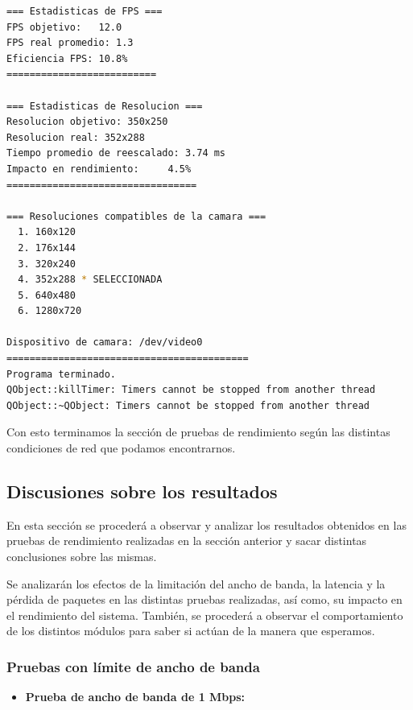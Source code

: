 \begin{adjustbox}{max width=\textwidth}
\begin{lstlisting}[language=bash,basicstyle=\ttfamily\scriptsize]
=== Estadisticas de FPS ===
FPS objetivo: 	12.0
FPS real promedio: 1.3
Eficiencia FPS:	10.8%
==========================

=== Estadisticas de Resolucion ===
Resolucion objetivo: 350x250
Resolucion real: 352x288
Tiempo promedio de reescalado: 3.74 ms
Impacto en rendimiento:    	4.5%
=================================

=== Resoluciones compatibles de la camara ===
  1. 160x120
  2. 176x144
  3. 320x240
  4. 352x288 * SELECCIONADA
  5. 640x480
  6. 1280x720

Dispositivo de camara: /dev/video0
==========================================
Programa terminado.
QObject::killTimer: Timers cannot be stopped from another thread
QObject::~QObject: Timers cannot be stopped from another thread
\end{lstlisting}
\end{adjustbox}
\vspace{\baselineskip}

Con esto terminamos la sección de pruebas de rendimiento según las distintas condiciones de red que podamos encontrarnos.  

\subsection{Discusiones sobre los resultados}

En esta sección se procederá a observar y analizar los resultados obtenidos en las pruebas de rendimiento realizadas en la sección anterior y sacar distintas conclusiones sobre las mismas. 
\vspace{\baselineskip}

Se analizarán los efectos de la limitación del ancho de banda, la latencia y la pérdida de paquetes en las distintas pruebas realizadas, así como, su impacto en el rendimiento del sistema. También, se procederá a observar el comportamiento de los distintos módulos para saber si actúan de la manera que esperamos.

\subsubsection{Pruebas con límite de ancho de banda}
\vspace{\baselineskip}

\begin{itemize}
  \item \textbf{Prueba de ancho de banda de 1 Mbps:}
\end{itemize}

